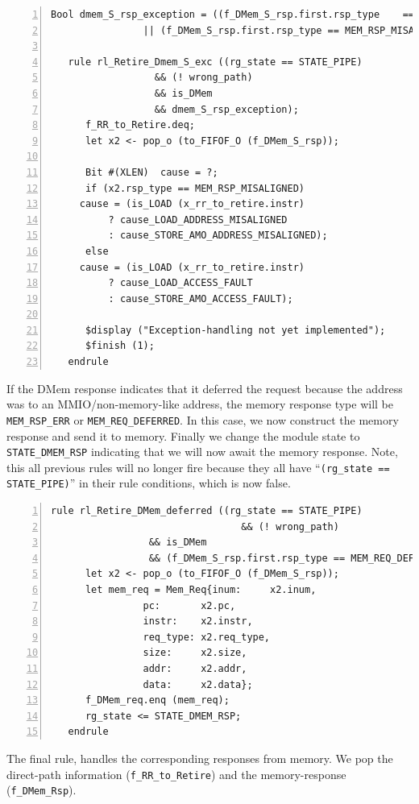 {\small
\begin{Verbatim}[frame=single, numbers=left, label=(In file:src\_Fife/S5\_Retire.bsv)]
   Bool dmem_S_rsp_exception = ((f_DMem_S_rsp.first.rsp_type    == MEM_RSP_ERR)
				|| (f_DMem_S_rsp.first.rsp_type == MEM_RSP_MISALIGNED));

   rule rl_Retire_Dmem_S_exc ((rg_state == STATE_PIPE)
			      && (! wrong_path)
			      && is_DMem
			      && dmem_S_rsp_exception);
      f_RR_to_Retire.deq;
      let x2 <- pop_o (to_FIFOF_O (f_DMem_S_rsp));

      Bit #(XLEN)  cause = ?;
      if (x2.rsp_type == MEM_RSP_MISALIGNED)
	 cause = (is_LOAD (x_rr_to_retire.instr)
		  ? cause_LOAD_ADDRESS_MISALIGNED
		  : cause_STORE_AMO_ADDRESS_MISALIGNED);
      else
	 cause = (is_LOAD (x_rr_to_retire.instr)
		  ? cause_LOAD_ACCESS_FAULT
		  : cause_STORE_AMO_ACCESS_FAULT);

      $display ("Exception-handling not yet implemented");
      $finish (1);
   endrule
\end{Verbatim}
}

If the DMem response indicates that it deferred the request because
the address was to an MMIO/non-memory-like address, the memory
response type will be \verb|MEM_RSP_ERR| or \verb|MEM_REQ_DEFERRED|.
In this case, we now construct the memory response and send it to
memory.  Finally we change the module state to \verb|STATE_DMEM_RSP|
indicating that we will now await the memory response.  Note, this all
previous rules will no longer fire because they all have
``\verb|(rg_state == STATE_PIPE)|'' in their rule conditions, which is
now false.

{\small
\begin{Verbatim}[frame=single, numbers=left, label=(In file:src\_Fife/S5\_Retire.bsv)]
   rule rl_Retire_DMem_deferred ((rg_state == STATE_PIPE)
                                 && (! wrong_path)
				 && is_DMem
				 && (f_DMem_S_rsp.first.rsp_type == MEM_REQ_DEFERRED));
      let x2 <- pop_o (to_FIFOF_O (f_DMem_S_rsp));
      let mem_req = Mem_Req{inum:     x2.inum,
			    pc:       x2.pc,
			    instr:    x2.instr,
			    req_type: x2.req_type,
			    size:     x2.size,
			    addr:     x2.addr,
			    data:     x2.data};
      f_DMem_req.enq (mem_req);
      rg_state <= STATE_DMEM_RSP;
   endrule
\end{Verbatim}
}

The final rule, handles the corresponding responses from memory.  We
pop the direct-path information (\verb|f_RR_to_Retire|) and the
memory-response (\verb|f_DMem_Rsp|).

